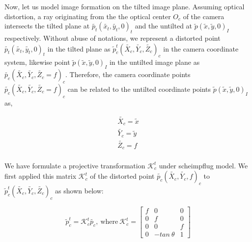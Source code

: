 \documentclass[12pt]{article}
\begin{document}
Now, let us model image formation on the tilted image plane. Assuming optical distortion, a ray originating from the the optical center $O_c$ of the camera intersects the tilted plane at $\tilde{p_t}(\tilde{x_t},  \tilde{y_t},0)_t$ and the untilted at $\tilde{p}(\tilde{x},\tilde{y},0)_I$ respectively. Without abuse of notations, we represent a distorted point $\tilde{p_t}(\tilde{x_t},\tilde{y_t},0)_t$ in the tilted plane as  $\tilde{p}_{c}^t(\tilde{X_c},\tilde{Y_c},\tilde{Z_c})_c$ in the camera coordinate system, likewise point $\tilde{p}(\tilde{x},\tilde{y},0)_I$ in the untilted image plane as $\tilde{p_{c}} (\tilde{X_c},\tilde{Y_c},\tilde{Z_c}=f)_c$. Therefore, the camera coordinate points $\tilde{p_{c}} (\tilde{X_c},\tilde{Y_c},\tilde{Z_c}=f)_c$ can be related to the untilted coordinate points $\tilde{p}(\tilde{x},\tilde{y},0)_I$ as,

\begin{equation}
\begin{split}
\tilde{X_c}= \tilde{x} \\
\tilde{Y_c}= \tilde{y} \\
\tilde{Z_c}= f \\
\end{split}
\end{equation}

We have formulate a projective transformation $\mathcal{K}_{c}^t$ under scheimpflug model. We first applied this matrix $\mathcal{K}_{c}^t$ of the distorted point $\tilde{p_{c}}(\tilde{X_c},\tilde{Y_c},f)_c$ to $\tilde{p}_{c}^t(\tilde{X_c},\tilde{Y_c},\tilde{Z_c})_c$ as shown below: %


\begin{equation}  
\tilde{p}_{c}^t=\mathcal{K}_{c}^t \tilde{p_{c}},  ~ \text{where}~\mathcal{K}_{c}^t=\begin{bmatrix}
f & 0 & 0\\
0 & f & 0 \\
0 & 0 & f \\
0 & -tan~\theta & 1 
\end{bmatrix} 
\label{eqn:Ad20}
\end{equation}


\end{document}
